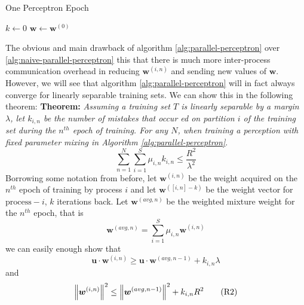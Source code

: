 \begin{algorithm}[ht!!!]
    \caption{One Perceptron Epoch}
    \label{alg:one-perceptron-epoch}
    \SetAlgoLined
    \BlankLine
    $k \gets 0$\;
    $\bm{w} \gets \bm{w}^{(0)}$\;
    \BlankLine
\end{algorithm}
The obvious and main drawback of algorithm \ref{alg:parallel-perceptron} over \ref{alg:naive-parallel-perceptron} this that there is much more inter-process communication overhead in reducing $\bm{w}^{(i,n)}$ and sending new values of $\bm{w}$. However, we will see that algorithm \ref{alg:parallel-perceptron} will in fact always converge for linearly separable training sets. We can show this in the following theorem:
\newpage
{\bf Theorem: } {\it Assuming a training set $T$ is linearly separable by a margin $\lambda$, let $k_{i,n}$ be the number of mistakes that occur ed on partition $i$ of the training set during the $n^{th}$ epoch of training. For any $N$, when training a perception with fixed parameter mixing in Algorithm \ref{alg:parallel-perceptron}}. \cite{10.5555/1857999.1858068}
\[
    \sum_{n=1}^{N} \sum_{i=1}^{S} \mu_{i,n} k_{i,n} \leq \frac{R^{2}}{\lambda^2}
\]
Borrowing some notation from before, let $\bm{w}^{(i,n)}$ be the weight acquired on the $n^{th}$ epoch of training by process $i$ and let $\bm{w}^{([i,n]-k)}$ be the weight vector for $\text{process}-i$, $k$ iterations back. Let $\bm{w}^{(avg,n)}$ be the weighted mixture weight for the $n^{th}$ epoch, that is
\[
    \bm{w}^{(avg,n)} = \sum_{i=1}^{S} \mu_{i,n} \bm{w}^{(i,n)}
\]
we can easily enough show that
\begin{equation}
    \label{eqn:R1}
    \bm{u} \cdot \bm{w}^{(i,n)} \geq \bm{u} \cdot \bm{w}^{(avg,n-1)} + k_{i,n} \lambda \tag{R1}
\end{equation}
and
\begin{equation}
    \label{eqn:R2}
    \left\lVert\bm{w}^{(i,n)}\right\rVert^2 \leq \left\lVert\bm{w}^{(avg,n-1)}\right\rVert^2 + k_{i,n} R^2 \tag{R2}
\end{equation}
